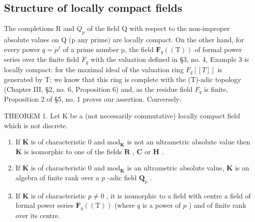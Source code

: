 \subsection{Structure of locally compact fields}

The completions R and \(Q_{p}\) of the field Q with respect to the non-improper absolute values on Q (p any prime) are locally compact. On the other hand, for every power \(q = p^{f}\) of a prime number p, the field \(\mathbf{F}_{q}((\mathrm{T}))\) of formal power series over the finite field \(F_{q}\) with the valuation defined in §3, no. 4, Example 3 is locally compact: for the maximal ideal of the valuation ring \(F_{q}[[T]]\) is generated by T; we know that this ring is complete with the (T)-adic topology (Chapter III, §2, no. 6, Proposition 6) and, as the residue field \(F_{q}\) is finite, Proposition 2 of §5, no. 1 proves our assertion. Conversely:

THEOREM 1. Let K be a (not necessarily commutative) locally compact field which is not discrete.

\begin{enumerate}
\def\labelenumi{(\roman{enumi})}
\item
  If \(\mathbf{K}\) is of characteristic 0 and \(\mathrm{mod}_{\mathbf{K}}\) is not an ultrametric absolute value then \(\mathbf{K}\) is isomorphic to one of the fields \(\mathbf{R}\) , \(\mathbf{C}\) or \(\mathbf{H}\) .
\item
  If \(\mathbf{K}\) is of characteristic 0 and \(\mathrm{mod}_{\mathbf{K}}\) is an ultrametric absolute value, \(\mathbf{K}\) is an algebra of finite rank over a \(p\) -adic field \(\mathbf{Q}_p\) .
\item
  If \(\mathbf{K}\) is of characteristic \(p \neq 0\) , it is isomorphic to a field with centre a field of formal power series \(\mathbf{F}_q((\mathrm{T}))\) (where \(q\) is a power of \(p\) ) and of finite rank over its centre.
\end{enumerate}


